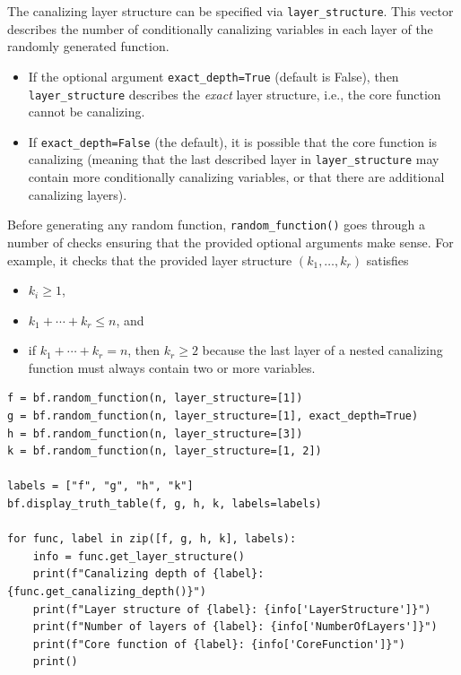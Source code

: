 \documentclass[
]{article}
\providecommand{\tightlist}{%
  \setlength{\itemsep}{0pt}\setlength{\parskip}{0pt}}
\begin{document}
The canalizing layer structure can be specified via
\texttt{layer\_structure}. This vector describes the number of
conditionally canalizing variables in each layer of the randomly
generated function.

\begin{itemize}
\tightlist
\item
  If the optional argument \texttt{exact\_depth=True} (default is
  False), then \texttt{layer\_structure} describes the \emph{exact}
  layer structure, i.e., the core function cannot be canalizing.
\item
  If \texttt{exact\_depth=False} (the default), it is possible that the
  core function is canalizing (meaning that the last described layer in
  \texttt{layer\_structure} may contain more conditionally canalizing
  variables, or that there are additional canalizing layers).
\end{itemize}

Before generating any random function, \texttt{random\_function()} goes
through a number of checks ensuring that the provided optional arguments
make sense. For example, it checks that the provided layer structure
\((k_1,\ldots,k_r)\) satisfies

\begin{itemize}
\tightlist
\item
  \(k_i\geq 1\),
\item
  \(k_1 + \cdots + k_r \leq n\), and
\item
  if \(k_1 + \cdots + k_r = n\), then \(k_r \geq 2\) because the last
  layer of a nested canalizing function must always contain two or more
  variables.
\end{itemize}

\begin{lstlisting}
f = bf.random_function(n, layer_structure=[1])
g = bf.random_function(n, layer_structure=[1], exact_depth=True)
h = bf.random_function(n, layer_structure=[3])
k = bf.random_function(n, layer_structure=[1, 2])

labels = ["f", "g", "h", "k"]
bf.display_truth_table(f, g, h, k, labels=labels)

for func, label in zip([f, g, h, k], labels):
    info = func.get_layer_structure()
    print(f"Canalizing depth of {label}: {func.get_canalizing_depth()}")
    print(f"Layer structure of {label}: {info['LayerStructure']}")
    print(f"Number of layers of {label}: {info['NumberOfLayers']}")
    print(f"Core function of {label}: {info['CoreFunction']}")
    print()
\end{lstlisting}
\end{document}
